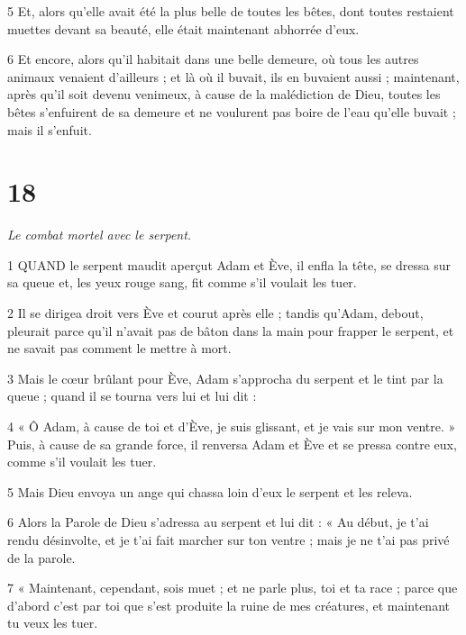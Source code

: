 \par 5 Et, alors qu'elle avait été la plus belle de toutes les bêtes, dont toutes restaient muettes devant sa beauté, elle était maintenant abhorrée d'eux.

\par 6 Et encore, alors qu'il habitait dans une belle demeure, où tous les autres animaux venaient d'ailleurs ; et là où il buvait, ils en buvaient aussi ; maintenant, après qu'il soit devenu venimeux, à cause de la malédiction de Dieu, toutes les bêtes s'enfuirent de sa demeure et ne voulurent pas boire de l'eau qu'elle buvait ; mais il s'enfuit.

\chapter{18}

\par \textit{Le combat mortel avec le serpent.}

\par 1 QUAND le serpent maudit aperçut Adam et Ève, il enfla la tête, se dressa sur sa queue et, les yeux rouge sang, fit comme s'il voulait les tuer.

\par 2 Il se dirigea droit vers Ève et courut après elle ; tandis qu'Adam, debout, pleurait parce qu'il n'avait pas de bâton dans la main pour frapper le serpent, et ne savait pas comment le mettre à mort.

\par 3 Mais le cœur brûlant pour Ève, Adam s'approcha du serpent et le tint par la queue ; quand il se tourna vers lui et lui dit :

\par 4 « Ô Adam, à cause de toi et d'Ève, je suis glissant, et je vais sur mon ventre. » Puis, à cause de sa grande force, il renversa Adam et Ève et se pressa contre eux, comme s'il voulait les tuer.

\par 5 Mais Dieu envoya un ange qui chassa loin d'eux le serpent et les releva.

\par 6 Alors la Parole de Dieu s'adressa au serpent et lui dit : « Au début, je t'ai rendu désinvolte, et je t'ai fait marcher sur ton ventre ; mais je ne t'ai pas privé de la parole.

\par 7 « Maintenant, cependant, sois muet ; et ne parle plus, toi et ta race ; parce que d’abord c’est par toi que s’est produite la ruine de mes créatures, et maintenant tu veux les tuer.

